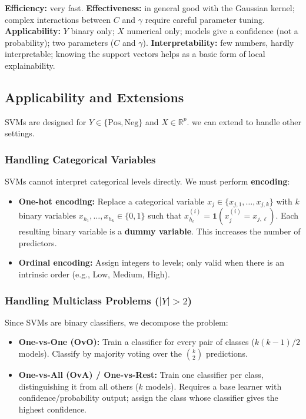 \begin{observationblock}
    \textbf{Efficiency:} very fast. \textbf{Effectiveness:} in general good with the Gaussian kernel; complex interactions between $C$ and $\gamma$ require careful parameter tuning. \textbf{Applicability:} $Y$ binary only; $X$ numerical only; models give a confidence (not a probability); two parameters ($C$ and $\gamma$). \textbf{Interpretability:} few numbers, hardly interpretable; knowing the support vectors helps as a basic form of local explainability.
\end{observationblock}

\subsection{Applicability and Extensions}

SVMs are designed for $Y \in \{\text{Pos}, \text{Neg}\}$ and $X \in \mathbb{R}^p$. we can extend to handle other settings.

\subsubsection{Handling Categorical Variables}

SVMs cannot interpret categorical levels directly. We must perform \textbf{encoding}:
\begin{itemize}
    \item \textbf{One-hot encoding:} Replace a categorical variable $x_j \in \{x_{j,1}, \ldots, x_{j,k}\}$ with $k$ binary variables $x_{h_1}, \ldots, x_{h_k} \in \{0, 1\}$ such that $x_{h_\ell}^{(i)} = \mathbf{1}(x_j^{(i)} = x_{j,\ell})$. Each resulting binary variable is a \textbf{dummy variable}. This increases the number of predictors.
    \item \textbf{Ordinal encoding:} Assign integers to levels; only valid when there is an intrinsic order (e.g., Low, Medium, High).
\end{itemize}

\subsubsection{Handling Multiclass Problems ($|Y| > 2$)}

Since SVMs are binary classifiers, we decompose the problem:
\begin{itemize}
    \item \textbf{One-vs-One (OvO):} Train a classifier for every pair of classes ($k(k-1)/2$ models). Classify by majority voting over the $\binom{k}{2}$ predictions.
    \item \textbf{One-vs-All (OvA) / One-vs-Rest:} Train one classifier per class, distinguishing it from all others ($k$ models). Requires a base learner with confidence/probability output; assign the class whose classifier gives the highest confidence.
\end{itemize}

